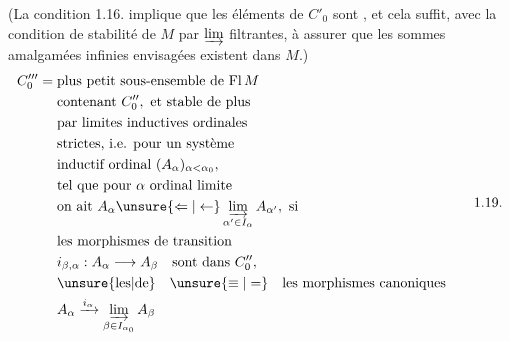 (La condition 1.16. implique que les éléments de $C'_0$ sont , et cela suffit, avec la condition de stabilité de $M$ par  $\varinjlim$ filtrantes, à assurer que les sommes amalgamées infinies envisagées  existent dans $M$.)
\[
\begin{aligned}
C'''_0={}&\text{plus petit sous-ensemble de }\mathrm{Fl}\,M\\
&\text{contenant }C''_0,\text{ et stable de plus}\\
&\text{par limites inductives ordinales}\\
&\text{strictes, i.e. pour un système}\\
&\text{inductif ordinal }(A_\alpha)_{\alpha<\alpha_0},\\
&\text{tel que pour }\alpha\text{ ordinal limite}\\
&\text{on ait } A_\alpha\unsure{\Leftarrow|\leftarrow}\varinjlim_{\alpha'\in I_\alpha}A_{\alpha'},\text{ si}\\
&\text{les morphismes de transition}\\
&i_{\beta,\alpha}:A_\alpha\longrightarrow A_\beta\quad\text{sont dans }C''_0,\\
&\text{\unsure{les|de}}\quad\unsure{\equiv|=}\quad\text{les morphismes canoniques}\\
&A_\alpha\xrightarrow{i_\alpha}\varinjlim_{\beta\in I_{\alpha_0}}A_\beta
\end{aligned}\tag*{1.19.}
\]
